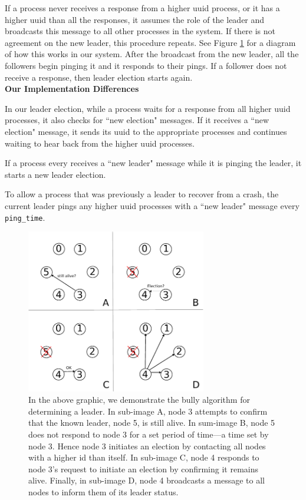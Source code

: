 \documentclass[preprint,review,12pt]{cs262}
\begin{document}
If a process never receives a response from a higher uuid process, or it has a higher uuid than all the responses, it assumes the role of the leader and broadcasts this message to all other processes in the system. If there is not agreement on the new leader, this procedure repeats. See Figure \ref{fig:bully} for a diagram of how this works in our system. After the broadcast from the new leader, all the followers begin pinging it and it responds to their pings. If a follower does not receive a response, then leader election starts again.\\ \textbf{Our Implementation Differences}

In our leader election, while a process waits for a response from all higher uuid processes, it also checks for ``new election" messages. If it receives a ``new election" message, it sends its uuid to the appropriate processes and continues waiting to hear back from the higher uuid processes.

If a process every receives a ``new leader" message while it is pinging the leader, it starts a new leader election.

To allow a process that was previously a leader to recover from a crash, the current leader pings any higher uuid processes with a ``new leader" message every \texttt{ping\_time}.

\begin{figure}[t!]
  \centering
  \includegraphics[width=0.7\textwidth]{figures/bully}
  \caption{In the above graphic, we demonstrate the bully algorithm for determining a leader. In sub-image A, node 3 attempts to confirm that the known leader, node 5, is still alive. In sum-image B, node 5 does not respond to node 3 for a set period of time---a time set by node 3. Hence node 3 initiates an election by contacting all nodes with a higher id than itself. In sub-image C, node 4 responds to node 3's request to initiate an election by confirming it remains alive. Finally, in sub-image D, node 4 broadcasts a message to all nodes to inform them of its leader status. 
 \label{fig:bully}}
\end{figure} 
\end{document}
